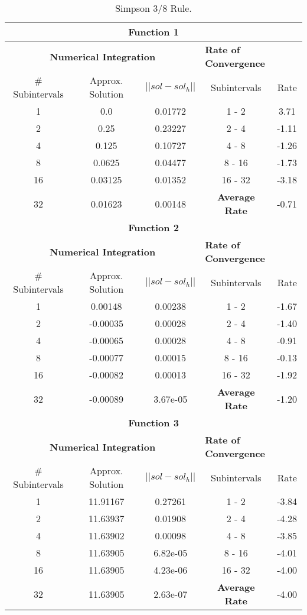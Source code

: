 \begin{table}[H]
    \centering
    \caption{Simpson 3/8 Rule.}
    \begin{tabular}{ccccc}
    \hline
    \multicolumn{5}{c}{\textbf{Function 1}} \\
    \hline
    \multicolumn{3}{c}{\textbf{Numerical Integration}} & \multicolumn{2}{l}{\textbf{Rate of Convergence}} \\\hline
    \# Subintervals & Approx. Solution & $|| sol - sol_h ||$ & Subintervals & Rate \\\hline
    1 & 0.0 & 0.01772 & 1 - 2 &  3.71\\
    2 & 0.25 & 0.23227 & 2 - 4 &  -1.11\\
    4 & 0.125 & 0.10727 & 4 - 8 &  -1.26\\
    8 & 0.0625 & 0.04477 & 8 - 16 &  -1.73\\
    16 & 0.03125 & 0.01352 & 16 - 32 &  -3.18\\
    32 & 0.01623 & 0.00148 & \textbf{Average Rate} & -0.71\\ \hline
    \multicolumn{5}{c}{\textbf{Function 2}} \\
    \hline
    \multicolumn{3}{c}{\textbf{Numerical Integration}} & \multicolumn{2}{l}{\textbf{Rate of Convergence}} \\\hline
    \# Subintervals & Approx. Solution & $|| sol - sol_h ||$ & Subintervals & Rate \\\hline
    1 & 0.00148 & 0.00238 & 1 - 2 &  -1.67\\
    2 & -0.00035 & 0.00028 & 2 - 4 &  -1.40\\
    4 & -0.00065 & 0.00028 & 4 - 8 &  -0.91\\
    8 & -0.00077 & 0.00015 & 8 - 16 &  -0.13\\
    16 & -0.00082 & 0.00013 & 16 - 32 &  -1.92\\
    32 & -0.00089 & 3.67e-05 & \textbf{Average Rate} & -1.20\\ \hline
    \multicolumn{5}{c}{\textbf{Function 3}} \\
    \hline
    \multicolumn{3}{c}{\textbf{Numerical Integration}} & \multicolumn{2}{l}{\textbf{Rate of Convergence}} \\\hline
    \# Subintervals & Approx. Solution & $|| sol - sol_h ||$ & Subintervals & Rate \\\hline
    1 & 11.91167 & 0.27261 & 1 - 2 &  -3.84\\
    2 & 11.63937 & 0.01908 & 2 - 4 &  -4.28\\
    4 & 11.63902 & 0.00098 & 4 - 8 &  -3.85\\
    8 & 11.63905 & 6.82e-05 & 8 - 16 &  -4.01\\
    16 & 11.63905 & 4.23e-06 & 16 - 32 &  -4.00\\
    32 & 11.63905 & 2.63e-07 & \textbf{Average Rate} & -4.00\\ \hline
\end{tabular}
\end{table}

